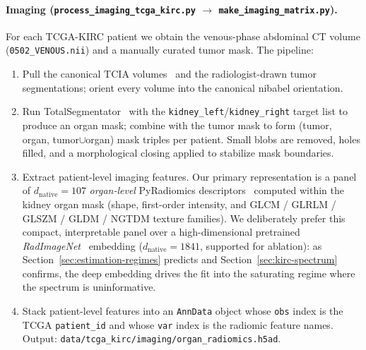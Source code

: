 \documentclass{article}
\begin{document}
\paragraph{Imaging
(\texttt{process\_imaging\_tcga\_kirc.py} $\to$ \texttt{make\_imaging\_matrix.py}).}
For each TCGA-KIRC patient we obtain the venous-phase abdominal CT volume
(\texttt{0502\_VENOUS.nii}) and a manually curated tumor mask. The pipeline:
\begin{enumerate}
\item Pull the canonical TCIA volumes~\citep{clark2013tcia,tcgakirc_tcia} and the
radiologist-drawn tumor
segmentations; orient every volume into the canonical
nibabel orientation.
\item Run TotalSegmentator~\citep{wasserthal2023totalsegmentator} with the
\texttt{kidney\_left}/\texttt{kidney\_right} target list to produce an organ
mask; combine with the tumor mask to form (tumor, organ, tumor$\cup$organ)
mask triples per patient. Small blobs are removed, holes filled, and a
morphological closing applied to stabilize mask boundaries.
\item Extract patient-level imaging features. Our primary representation is a
panel of $d_{\mathrm{native}} = 107$ \emph{organ-level} PyRadiomics
descriptors~\citep{vangriethuysen2017pyradiomics,aerts2014radiomics} computed
within the kidney organ mask (shape, first-order intensity, and GLCM / GLRLM /
GLSZM / GLDM / NGTDM texture families). We deliberately prefer this compact,
interpretable panel over a high-dimensional pretrained
\emph{RadImageNet}~\citep{mei2022radimagenet} embedding
($d_{\mathrm{native}}=1841$, supported for ablation): as
Section~\ref{sec:estimation-regimes} predicts and
Section~\ref{sec:kirc-spectrum} confirms, the deep embedding drives the fit
into the saturating regime where the spectrum is uninformative.
\item Stack patient-level features into an \texttt{AnnData} object whose
\texttt{obs} index is the TCGA \texttt{patient\_id} and whose \texttt{var}
index is the radiomic feature names. Output:
\texttt{data/tcga\_kirc/imaging/organ\_radiomics.h5ad}.
\end{enumerate}
\end{document}
